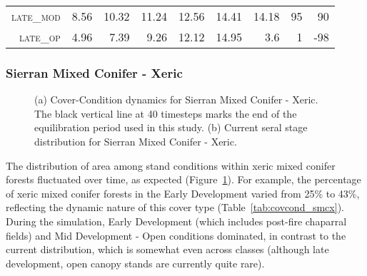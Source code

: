 \begin{table}[!htbp]
\begin{tabular}{@{}rrrrrr|rrr@{}}
\footnotesize \textsc{late\_mod }        & \footnotesize  8.56        & \footnotesize 10.32   & \footnotesize 11.24     & \footnotesize 12.56   & \footnotesize 14.41     & \footnotesize 14.18    & \footnotesize 95    & \footnotesize 90      \\
\footnotesize \textsc{late\_op  }        & \footnotesize  4.96        & \footnotesize 7.39    & \footnotesize 9.26      & \footnotesize 12.12   & \footnotesize 14.95     & \footnotesize 3.6      & \footnotesize 1     & \footnotesize -98      \\
  \hline
\end{tabular}
\end{table}





\clearpage
\subsubsection{Sierran Mixed Conifer - Xeric}

\begin{figure}[!htbp]
  \centering
  \caption{(a) Cover-Condition dynamics for Sierran Mixed Conifer - Xeric. The black vertical line at 40 timesteps marks the end of the equilibration period used in this study. (b) Current seral stage distribution for Sierran Mixed Conifer - Xeric.} 
  \label{fig:covcond_smcx}
\end{figure}

The distribution of area among stand conditions within xeric mixed conifer forests fluctuated over time, as expected (Figure~\ref{fig:covcond_smcx}). For example, the percentage of xeric mixed conifer forests in the Early Development varied from 25\% to 43\%, reflecting the dynamic nature of this cover type (Table~\ref{tab:covcond_smcx}). During the simulation, Early Development (which includes post-fire chaparral fields) and Mid Development - Open conditions dominated, in contrast to the current distribution, which is somewhat even across classes (although late development, open canopy stands are currently quite rare).  %

